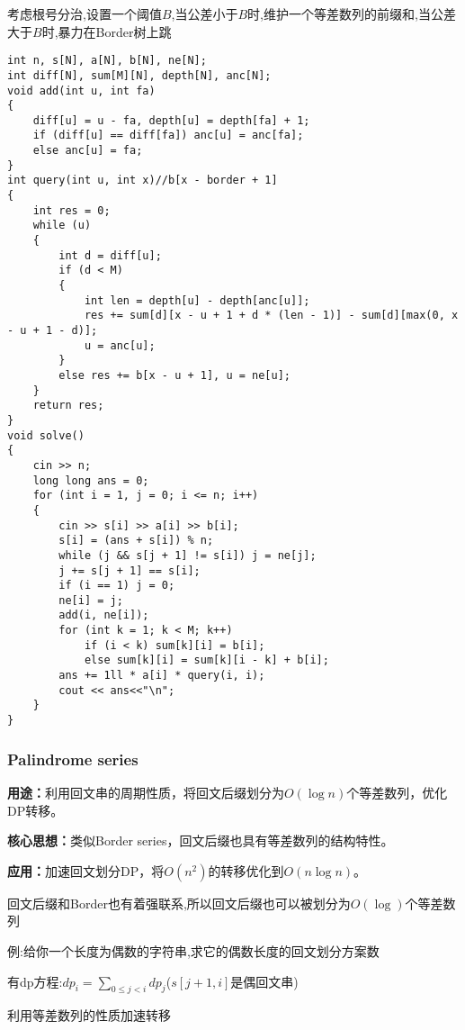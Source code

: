 \documentclass[a4paper,fontset=none]{ctexart}
\begin{document}
考虑根号分治,设置一个阈值$B$,当公差小于$B$时,维护一个等差数列的前缀和,当公差大于$B$时,暴力在Border树上跳

\begin{verbatim}
int n, s[N], a[N], b[N], ne[N];
int diff[N], sum[M][N], depth[N], anc[N];
void add(int u, int fa)
{
    diff[u] = u - fa, depth[u] = depth[fa] + 1;
    if (diff[u] == diff[fa]) anc[u] = anc[fa];
    else anc[u] = fa;
}
int query(int u, int x)//b[x - border + 1]
{
    int res = 0;
    while (u)
    {
        int d = diff[u];
        if (d < M)
        {
            int len = depth[u] - depth[anc[u]];
            res += sum[d][x - u + 1 + d * (len - 1)] - sum[d][max(0, x - u + 1 - d)];
            u = anc[u];
        }
        else res += b[x - u + 1], u = ne[u];
    }
    return res;
}
void solve()
{
    cin >> n;
    long long ans = 0;
    for (int i = 1, j = 0; i <= n; i++)
    {
        cin >> s[i] >> a[i] >> b[i];
        s[i] = (ans + s[i]) % n;
        while (j && s[j + 1] != s[i]) j = ne[j];
        j += s[j + 1] == s[i];
        if (i == 1) j = 0;
        ne[i] = j;
        add(i, ne[i]);
        for (int k = 1; k < M; k++)
            if (i < k) sum[k][i] = b[i];
            else sum[k][i] = sum[k][i - k] + b[i];
        ans += 1ll * a[i] * query(i, i);
        cout << ans<<"\n";
    }
}
\end{verbatim}
\subsubsection{Palindrome series}
\textbf{用途：}利用回文串的周期性质，将回文后缀划分为$O(\log n)$个等差数列，优化DP转移。

\textbf{核心思想：}类似Border series，回文后缀也具有等差数列的结构特性。

\textbf{应用：}加速回文划分DP，将$O(n^2)$的转移优化到$O(n\log n)$。

回文后缀和Border也有着强联系,所以回文后缀也可以被划分为$O(\log)$个等差数列

例:给你一个长度为偶数的字符串,求它的偶数长度的回文划分方案数

有dp方程:$dp_i=\sum\limits_{0\leqslant j < i}dp_j$($s[j+1,i]$是偶回文串)

利用等差数列的性质加速转移
\end{document}
